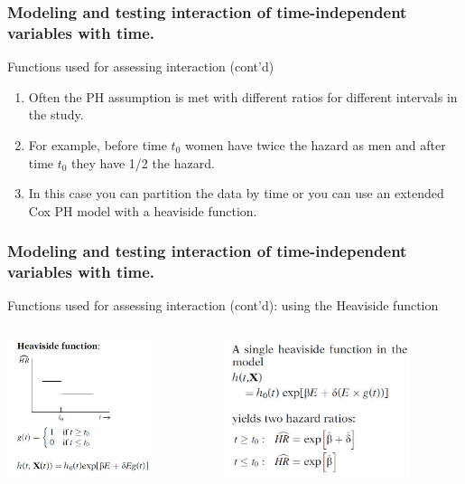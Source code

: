 \documentclass{beamer}
\theoremstyle{definition}
\begin{document}
\begin{frame}
\frametitle{Modeling and testing interaction of time-independent variables with time.}
\begin{block}{Functions used for assessing interaction (cont'd)}
\begin{enumerate}
\item Often the PH assumption is met with different ratios for different intervals in the study.
\item For example, before time $t_0$ women have twice the hazard as men and after time $t_0$ they have 1/2 the hazard.
\item In this case you can partition the data by time or you can use an extended Cox PH model with a heaviside function.
\end{enumerate}
\end{block}
\end{frame}


\begin{frame}
\frametitle{Modeling and testing interaction of time-independent variables with time.}
\begin{block}{Functions used for assessing interaction (cont'd): using the Heaviside function}
\begin{columns}
    \begin{column}{0.48\textwidth}
        \includegraphics[width =\textwidth, height=4cm]{CH6_HeSi.JPG}
    \end{column}
    \hspace{-10pt}
    \begin{column}{0.48\textwidth}
         \includegraphics[width =\textwidth, height=4cm]{CH6_HeSi2.JPG}
    \end{column}
\end{columns}
\end{block}
\end{frame}
\end{document}
